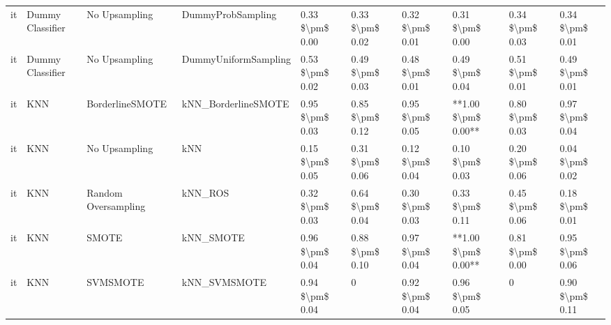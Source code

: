\begin{tabular}{llllllllll}
      it &                Dummy Classifier &                 No Upsampling &                            DummyProbSampling &     0.33 \$\textbackslash pm\$ 0.00 &           0.33 \$\textbackslash pm\$ 0.02 &       0.32 \$\textbackslash pm\$ 0.01 &        0.31 \$\textbackslash pm\$ 0.00 &                         0.34 \$\textbackslash pm\$ 0.03 &     0.34 \$\textbackslash pm\$ 0.01 \\
      it &                Dummy Classifier &                 No Upsampling &                         DummyUniformSampling &     0.53 \$\textbackslash pm\$ 0.02 &           0.49 \$\textbackslash pm\$ 0.03 &       0.48 \$\textbackslash pm\$ 0.01 &        0.49 \$\textbackslash pm\$ 0.04 &                         0.51 \$\textbackslash pm\$ 0.01 &     0.49 \$\textbackslash pm\$ 0.01 \\
      it &                             KNN &               BorderlineSMOTE &                          kNN\_BorderlineSMOTE &     0.95 \$\textbackslash pm\$ 0.03 &           0.85 \$\textbackslash pm\$ 0.12 &       0.95 \$\textbackslash pm\$ 0.05 &    **1.00 \$\textbackslash pm\$ 0.00** &                         0.80 \$\textbackslash pm\$ 0.03 &     0.97 \$\textbackslash pm\$ 0.04 \\
      it &                             KNN &                 No Upsampling &                                          kNN &     0.15 \$\textbackslash pm\$ 0.05 &           0.31 \$\textbackslash pm\$ 0.06 &       0.12 \$\textbackslash pm\$ 0.04 &        0.10 \$\textbackslash pm\$ 0.03 &                         0.20 \$\textbackslash pm\$ 0.06 &     0.04 \$\textbackslash pm\$ 0.02 \\
      it &                             KNN &           Random Oversampling &                                      kNN\_ROS &     0.32 \$\textbackslash pm\$ 0.03 &           0.64 \$\textbackslash pm\$ 0.04 &       0.30 \$\textbackslash pm\$ 0.03 &        0.33 \$\textbackslash pm\$ 0.11 &                         0.45 \$\textbackslash pm\$ 0.06 &     0.18 \$\textbackslash pm\$ 0.01 \\
      it &                             KNN &                         SMOTE &                                    kNN\_SMOTE &     0.96 \$\textbackslash pm\$ 0.04 &           0.88 \$\textbackslash pm\$ 0.10 &       0.97 \$\textbackslash pm\$ 0.04 &    **1.00 \$\textbackslash pm\$ 0.00** &                         0.81 \$\textbackslash pm\$ 0.00 &     0.95 \$\textbackslash pm\$ 0.06 \\
      it &                             KNN &                      SVMSMOTE &                                 kNN\_SVMSMOTE &     0.94 \$\textbackslash pm\$ 0.04 &                         0 &       0.92 \$\textbackslash pm\$ 0.04 &        0.96 \$\textbackslash pm\$ 0.05 &                                       0 &     0.90 \$\textbackslash pm\$ 0.11 \\

\end{tabular}
